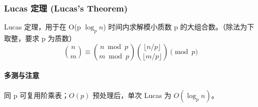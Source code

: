 \subsubsection{Lucas 定理 (Lucas's Theorem)}
Lucas 定理，用于在 O(p $\log_p n$) 时间内求解模小质数 p 的大组合数。（除法为下取整，要求 p 为质数）
$$ \binom{n}{m} \equiv \binom{n \bmod p}{m \bmod p} \binom{\lfloor n/p \rfloor}{\lfloor m/p \rfloor} \pmod p $$

\paragraph{多测与注意} 同 p 可复用阶乘表；$O(p)$ 预处理后，单次 Lucas 为 $O(\log_p n)$。
